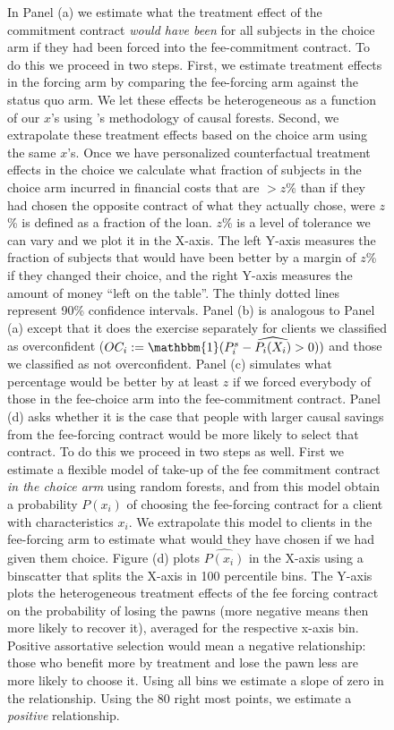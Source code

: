 \documentclass[oneside,11pt]{article}
\begin{document}
\begin{figure}[H]
\begin{center}
    \end{center}
        \scriptsize
        In Panel (a) we estimate what the treatment effect of the commitment contract \textit{would have been} for all subjects in the choice arm if they had been forced into the fee-commitment contract. To do this we proceed in two steps. First, we estimate treatment effects in the forcing arm by comparing the fee-forcing arm against the status quo arm. We let these effects be heterogeneous as a function of our $x$'s using \cite{atheygrf}'s methodology of causal forests. Second, we extrapolate these treatment effects based on the choice arm using the same $x$'s. Once we have personalized counterfactual treatment effects in the choice we calculate what fraction of subjects in the choice arm incurred in financial costs that are  $> z$\% than if they had chosen the opposite contract of what they actually chose, were $z$\% is defined as a fraction of the loan. $z$\% is a level of tolerance we can vary and we plot it in the X-axis. The left Y-axis measures the fraction of subjects that would have been better by a margin of $z$\% if they changed their choice, and the right Y-axis measures the amount of money ``left on the table''. The thinly dotted lines represent 90\% confidence intervals.  Panel (b) is analogous to Panel (a) except that it does the exercise separately for clients we classified as overconfident ($OC_i:=\mathbbm{1}(P^s_i-\widehat{P_i(X_i)}>0))$ and those we classified as not overconfident. Panel (c) simulates what percentage would be better by at least $z$ if we forced everybody of those in the fee-choice arm into the fee-commitment contract. Panel (d) asks whether it is the case that people with larger causal savings from the fee-forcing contract would be more likely to select that contract. To do this we proceed in two steps as well. First we estimate a flexible model of take-up of the fee commitment contract \textit{in the choice arm} using random forests, and from this model obtain a probability $P(x_i)$ of choosing the fee-forcing contract for a client with characteristics $x_i$. We extrapolate this model to clients in the fee-forcing arm to estimate what would they have chosen if we had given them choice. Figure (d) plots $\widehat{P(x_i)}$ in the X-axis using a binscatter that splits the X-axis in 100 percentile bins. The Y-axis plots the heterogeneous treatment effects of the fee forcing contract on the probability of losing the pawns (more negative means then more likely to recover it), averaged for the respective x-axis bin. Positive assortative selection would mean a negative relationship: those who benefit more by treatment and lose the pawn less are more likely to choose it.  Using all bins we estimate a slope of zero in the relationship. Using the 80 right most points, we estimate a \textit{positive} relationship.
\end{figure}
\end{document}
